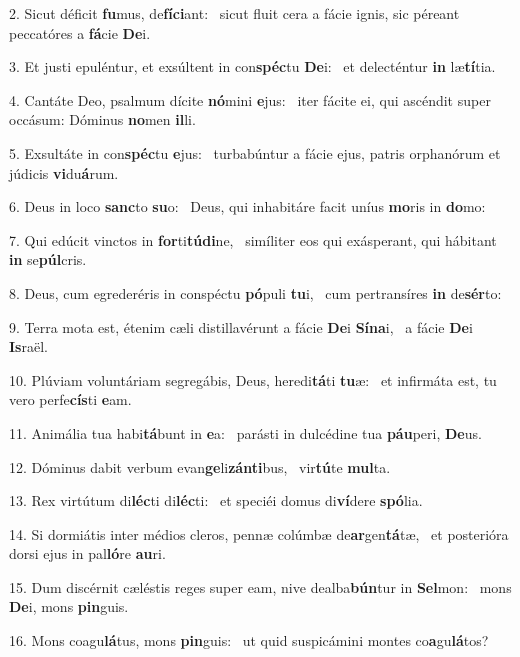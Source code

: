 2. Sicut déficit \textbf{fu}mus, de\textbf{fí}\textbf{ci}ant: \ast\  sicut fluit cera a fácie ignis, sic péreant peccatóres a \textbf{fá}cie \textbf{De}i.\

3. Et justi epuléntur, et exsúltent in con\textbf{spéc}tu \textbf{De}i: \ast\  et delecténtur \textbf{in} læ\textbf{tí}tia.\

4. Cantáte Deo, psalmum dícite \textbf{nó}mini \textbf{e}jus: \ast\  iter fácite ei, qui ascéndit super occásum: Dóminus \textbf{no}men \textbf{il}li.\

5. Exsultáte in con\textbf{spéc}tu \textbf{e}jus: \ast\  turbabúntur a fácie ejus, patris orphanórum et júdicis \textbf{vi}du\textbf{á}rum.\

6. Deus in loco \textbf{sanc}to \textbf{su}o: \ast\  Deus, qui inhabitáre facit uníus \textbf{mo}ris in \textbf{do}mo:\

7. Qui edúcit vinctos in \textbf{for}ti\textbf{tú}\textbf{di}ne, \ast\  simíliter eos qui exásperant, qui hábitant \textbf{in} se\textbf{púl}cris.\

8. Deus, cum egrederéris in conspéctu \textbf{pó}puli \textbf{tu}i, \ast\  cum pertransíres \textbf{in} de\textbf{sér}to:\

9. Terra mota est, étenim cæli distillavérunt a fácie \textbf{De}i \textbf{Sí}\textbf{na}i, \ast\  a fácie \textbf{De}i \textbf{Is}raël.\

10. Plúviam voluntáriam segregábis, Deus, heredi\textbf{tá}ti \textbf{tu}æ: \ast\  et infirmáta est, tu vero perfe\textbf{cís}ti \textbf{e}am.\

11. Animália tua habi\textbf{tá}bunt in \textbf{e}a: \ast\  parásti in dulcédine tua \textbf{páu}peri, \textbf{De}us.\

12. Dóminus dabit verbum evan\textbf{ge}li\textbf{zán}\textbf{ti}bus, \ast\  vir\textbf{tú}te \textbf{mul}ta.\

13. Rex virtútum di\textbf{léc}ti di\textbf{léc}ti: \ast\  et speciéi domus di\textbf{ví}dere \textbf{spó}lia.\

14. Si dormiátis inter médios cleros, pennæ colúmbæ de\textbf{ar}gen\textbf{tá}tæ, \ast\  et posterióra dorsi ejus in pal\textbf{ló}re \textbf{au}ri.\

15. Dum discérnit cæléstis reges super eam, nive dealba\textbf{bún}tur in \textbf{Sel}mon: \ast\  mons \textbf{De}i, mons \textbf{pin}guis.\

16. Mons coagu\textbf{lá}tus, mons \textbf{pin}guis: \ast\  ut quid suspicámini montes co\textbf{a}gu\textbf{lá}tos?\


